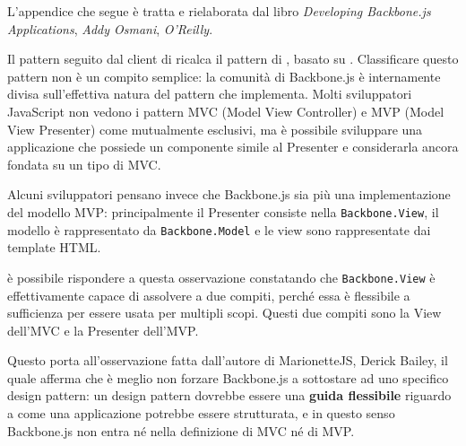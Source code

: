 


L'appendice che segue \`e tratta e rielaborata dal libro \emph{Developing Backbone.js Applications}, \emph{Addy Osmani}, \emph{O'Reilly}.

Il pattern seguito dal client di \proj{} ricalca il pattern di \jointjs, basato su \backbonejs. Classificare questo pattern non \`e un compito semplice: la comunit\`a di Backbone.js \`e internamente divisa sull'effettiva natura del pattern che implementa. Molti sviluppatori JavaScript non vedono i pattern MVC (Model View Controller) e MVP (Model View Presenter) come mutualmente esclusivi, ma \`e possibile sviluppare una applicazione che possiede un componente simile al Presenter e considerarla ancora fondata su un tipo di MVC.

Alcuni sviluppatori pensano invece che Backbone.js sia pi\`u una implementazione del modello MVP: principalmente il Presenter consiste nella \texttt{Backbone.View}, il modello \`e rappresentato da \texttt{Backbone.Model} e le view sono rappresentate dai template HTML. 

\`e possibile rispondere a questa osservazione constatando che \texttt{Backbone.View} \`e effettivamente capace di assolvere a due compiti, perch\'e essa \`e flessibile a sufficienza per essere usata per multipli scopi. Questi due compiti sono la View dell'MVC e la Presenter dell'MVP.

Questo porta all'osservazione fatta dall'autore di MarionetteJS, Derick Bailey, il quale afferma che \`e meglio non forzare Backbone.js a sottostare ad uno specifico design pattern: un design pattern dovrebbe essere una \textbf{guida flessibile} riguardo a come una applicazione potrebbe essere strutturata, e in questo senso Backbone.js non entra n\'e nella definizione di MVC n\'e di MVP.
